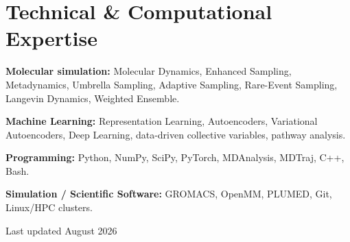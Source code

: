 \documentclass[10pt,a4paper]{article}
\newcommand{\keywordsline}[1]{%
  \par\noindent\small #1\par
}
\begin{document}
\section{Technical \& Computational Expertise}

\textbf{Molecular simulation:} Molecular Dynamics, Enhanced Sampling, Metadynamics, Umbrella
Sampling, Adaptive Sampling, Rare-Event Sampling, Langevin Dynamics, Weighted Ensemble.\par
\vspace{4pt}
\textbf{Machine Learning:} Representation Learning, Autoencoders, Variational Autoencoders,
Deep Learning, data-driven collective variables, pathway analysis.\par
\vspace{4pt}
\textbf{Programming:} Python, NumPy, SciPy, PyTorch, MDAnalysis, MDTraj, C++, Bash.\par
\vspace{4pt}
\textbf{Simulation / Scientific Software:} GROMACS, OpenMM, PLUMED, Git, Linux/HPC clusters.


\vspace{0.6em}
{\footnotesize\color{muted} Last updated August 2026}
\end{document}
